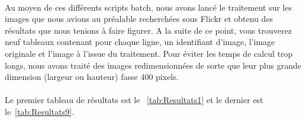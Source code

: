 \documentclass[11pt, french]{report-rd-info}
\begin{document}
\paragraph*{}
Au moyen de ces différents scripts batch, nous avons lancé le traitement sur les images que nous avions au préalable recherchées sous Flickr et obtenu des résultats que nous tenions à faire figurer. A la suite de ce point, vous trouverez neuf tableaux contenant pour chaque ligne, un identifiant d'image, l'image originale et l'image à l'issue du traitement. Pour éviter les temps de calcul trop longs, nous avons traité des images redimensionnées de sorte que leur plus grande dimension (largeur ou hauteur) fasse 400 pixels.   

\paragraph*{}
Le premier tableau de résultats est le ~\ref{tab:Resultats1} et le dernier est le~\ref{tab:Resultats9}.
\end{document}
